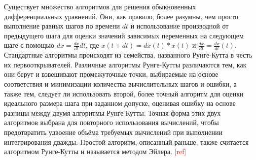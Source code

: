 \documentclass[A4,12pt,oneside]{article}
\renewcommand{\(}{\left(}
\renewcommand{\)}{\right)}
\newcommand{\citeph}{\textcolor{red}{[ref] }}
\begin{document}
Существует множество алгоритмов для решения обыкновенных дифференциальных уравнений. Они, как правило, более разумны, чем просто выполнение равных шагов по времени $dt$ и использование производной от предыдущего шага для оценки значений зависимых переменных на следующем шаге с помощью $dx = \frac{dx}{dt}dt$, где $x\left(t + dt\right) = dx\left(t\right) * x\left(t\right)$ и $\frac{dx}{dt} = \frac{dx}{dt} \left(t\right)$. 
Стандартные алгоритмы происходят из семейства, названного Рунге-Кутта в честь их первооткрывателей. Различные алгоритмы Рунге-Кутты различаются тем, как они берут и взвешивают промежуточные точки, выбираемые на основе соответствия и минимизации количества вычислительных шагов и ошибки, а также тем, следует ли использовать второй, более точный алгоритм для оценки идеального размера шага при заданном допуске, оценивая ошибку на основе разницы между двумя алгоритмы Рунге-Кутты. Точная форма этих двух алгоритмов выбрана для повторного использования вычислений, чтобы предотвратить удвоение объёма требуемых вычислений при выполнении интегрирования дважды. Простой алгоритм, описанный раньше, также считается алгоритмом Рунге-Кутты и называется методом Эйлера. \citeph
\end{document}
